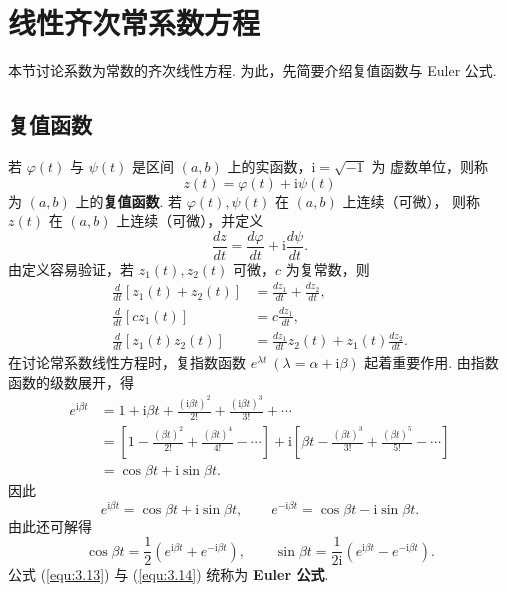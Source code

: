 \section{线性齐次常系数方程}\label{sec:3.3}
本节讨论系数为常数的齐次线性方程. 为此，先简要介绍复值函数与 Euler 公式.

\subsection{复值函数}
若 $\varphi(t)$ 与 $\psi(t)$ 是区间 $(a,b)$ 上的实函数，$\mathrm{i}=\sqrt{-1}$ 为
虚数单位，则称
\[
z(t)=\varphi(t)+\mathrm{i}\psi(t)
\]
为 $(a,b)$ 上的\textbf{复值函数}. 若 $\varphi(t),\psi(t)$ 在 $(a,b)$ 上连续（可微），
则称 $z(t)$ 在 $(a,b)$ 上连续（可微），并定义
\[
\frac{dz}{dt}=\frac{d\varphi}{dt}+\mathrm{i}\frac{d\psi}{dt}.
\]
由定义容易验证，若 $z_1(t),z_2(t)$ 可微，$c$ 为复常数，则
\[
\begin{aligned}
\frac{d}{dt}\left[z_1(t)+z_2(t)\right]&=\frac{dz_1}{dt}+\frac{dz_2}{dt},\\
\frac{d}{dt}\left[cz_1(t)\right]&=c\frac{dz_1}{dt},\\
\frac{d}{dt}\left[z_1(t)z_2(t)\right]&=\frac{dz_1}{dt}z_2(t)
+z_1(t)\frac{dz_2}{dt}.
\end{aligned}
\]
在讨论常系数线性方程时，复指数函数 $e^{\lambda t}\ (\lambda=\alpha+\mathrm{i}
\beta)$ 起着重要作用. 由指数函数的级数展开，得
\[
\begin{aligned}
e^{\mathrm{i}\beta t}
&=1+\mathrm{i}\beta t+\frac{(\mathrm{i}\beta t)^2}{2!}
+\frac{(\mathrm{i}\beta t)^3}{3!}+\cdots\\
&=\left[1-\frac{(\beta t)^2}{2!}+\frac{(\beta t)^4}{4!}-\cdots\right]
+\mathrm{i}\left[\beta t-\frac{(\beta t)^3}{3!}
+\frac{(\beta t)^5}{5!}-\cdots\right]\\
&=\cos\beta t+\mathrm{i}\sin\beta t.
\end{aligned}
\]
因此
\begin{equation}\label{equ:3.13}
e^{\mathrm{i}\beta t}=\cos\beta t+\mathrm{i}\sin\beta t,\qquad
e^{-\mathrm{i}\beta t}=\cos\beta t-\mathrm{i}\sin\beta t.
\end{equation}
由此还可解得
\begin{equation}\label{equ:3.14}
\cos\beta t=\frac12\left(e^{\mathrm{i}\beta t}+e^{-\mathrm{i}\beta t}\right),
\qquad
\sin\beta t=\frac{1}{2\mathrm{i}}\left(e^{\mathrm{i}\beta t}
-e^{-\mathrm{i}\beta t}\right).
\end{equation}
公式 (\ref{equ:3.13}) 与 (\ref{equ:3.14}) 统称为 \textbf{Euler 公式}.

